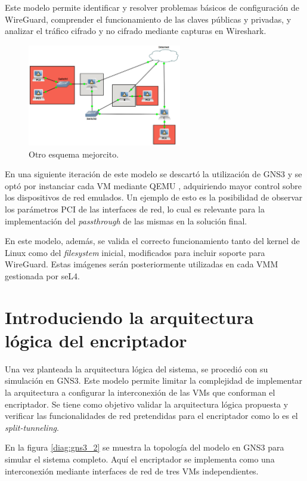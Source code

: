 Este modelo permite identificar y resolver problemas básicos de configuración de WireGuard, comprender el funcionamiento de las claves públicas y privadas, y analizar el tráfico cifrado y no cifrado mediante capturas en Wireshark.

\begin{figure}[h!]
    \centering
    \includegraphics[width=0.6\textwidth]{../figs/gns3_1.png}
    \caption{Otro esquema mejorcito.}
    \label{diag:wg_minimal}
\end{figure}

En una siguiente iteración de este modelo se descartó la utilización de GNS3 y se optó por instanciar cada VM mediante QEMU %
, adquiriendo mayor control sobre los dispositivos de red emulados. Un ejemplo de esto es la posibilidad de observar los parámetros PCI de las interfaces de red, lo cual es relevante para la implementación del \textit{passthrough} de las mismas en la solución final.

En este modelo, además, se valida el correcto funcionamiento tanto del kernel de Linux como del \textit{filesystem} inicial, modificados para incluir soporte para WireGuard. Estas imágenes serán posteriormente utilizadas en cada VMM gestionada por seL4.

\section{Introduciendo la arquitectura lógica del encriptador}
Una vez planteada la arquitectura lógica del sistema, se procedió con su simulación en GNS3. Este modelo permite limitar la complejidad de implementar la arquitectura a configurar la interconexión de las VMs que conforman el encriptador. Se tiene como objetivo validar la arquitectura lógica propuesta y verificar las funcionalidades de red pretendidas para el encriptador como lo es el \textit{split-tunneling}.

En la figura \ref{diag:gns3_2} se muestra la topología del modelo en GNS3 para simular el sistema completo. Aquí el encriptador se implementa como una interconexión mediante interfaces de red de tres VMs independientes. 

